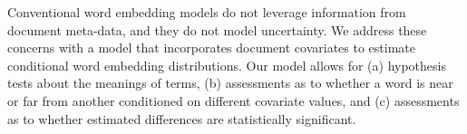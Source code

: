 Conventional word embedding models do not leverage information from document meta-data, and they do not model uncertainty. We address these concerns with a model that incorporates document covariates to estimate conditional word embedding distributions. Our model allows for (a) hypothesis tests about the meanings of terms, (b) assessments as to whether a word is near or far from another conditioned on different covariate values, and (c) assessments as to whether estimated differences are statistically significant.
